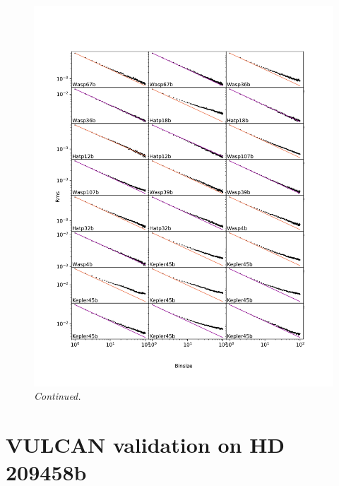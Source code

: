 \begin{subappendices}
  \addtocounter{figure}{-1}
  \begin{figure}
      \label{P1:fig:rmsvsbin2}
    \includegraphics[width=\textwidth]{rmsVsbinsize2.pdf}
    \caption{\textit{Continued.}}
  \end{figure}


  \section{VULCAN validation on HD 209458b}


\end{subappendices}
